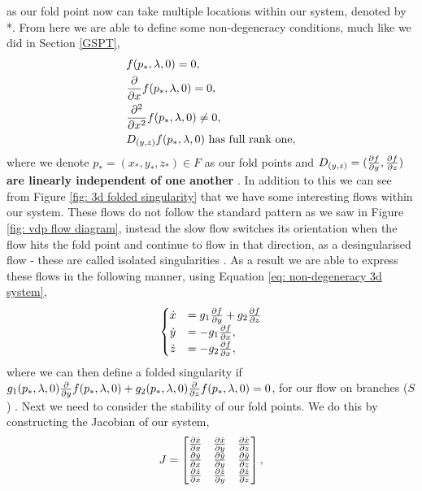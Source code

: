 as our fold point now can take multiple locations within our system, denoted by *. From here we are able to define some non-degeneracy conditions, much like we did in Section \ref{GSPT},
\begin{equation}
\begin{aligned}
&f(p_*,\lambda,0)=0,\\
&\pd{}{x}f(p_*,\lambda,0)=0,\\
&\pd{^2}{x^2}f(p_*,\lambda,0)\neq 0,\\
&D_{(y,z)}f(p_*,\lambda,0) \ \text{has full rank one},
\end{aligned}
\label{eq: non-degeneracy 3d system}	
\end{equation}
where we denote $ p_*=(x_*,y_*,z_*)\in F $ as our fold points and\textbf{ $ D_{(y,z)}=(\pd{f}{y},\pd{f}{z}) $ are linearly independent of one another } \citep{MMO}. In addition to this we can see from Figure \ref{fig: 3d folded singularity} that we have some interesting flows within our system. These flows do not follow the standard pattern as we saw in Figure \ref{fig: vdp flow diagram}, instead the slow flow switches its orientation when the flow hits the fold point and continue to flow in that direction, as a desingularised flow - these are called isolated singularities \citep{MMO}. %
As a result we are able to express these flows in the following manner, using Equation \ref{eq: non-degeneracy 3d system}, 
\begin{equation}
\begin{cases}
\dot{x}&=g_1\pd{f}{y}+g_2\pd{f}{z}\\
\dot{y}&=-g_1\pd{f}{x},\\
\dot{z}&=-g_2\pd{f}{x},
\end{cases}
\end{equation}
where we can then define a folded singularity if $ g_1(p_*,\lambda,0)\pd{}{y}f(p_*,\lambda,0)+g_2(p_*,\lambda,0)\pd{}{z}f(p_*,\lambda,0)=0 $, for our flow on branches ($ S $) \citep{MMO}. Next we need to consider the stability of our fold points. We do this by constructing the Jacobian of our system, 
\begin{equation}
J=\begin{bmatrix}
\pd{\dot{x}}{x}&\pd{\dot{x}}{y}&\pd{\dot{x}}{z}\\
\pd{\dot{y}}{x}&\pd{\dot{y}}{y}&\pd{\dot{y}}{z}\\
\pd{\dot{z}}{x}&\pd{\dot{z}}{y}&\pd{\dot{z}}{z}\\
\end{bmatrix},
\end{equation}

